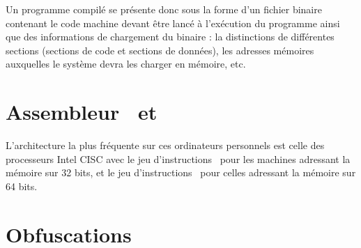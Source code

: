 Un programme compilé se présente donc sous la forme d'un fichier binaire contenant le code machine devant être lancé à l'exécution du programme ainsi que des informations de chargement du binaire : la distinctions de différentes sections (sections de code et sections de données), les adresses mémoires auxquelles le système devra les charger en mémoire, etc.

\section{Assembleur \xq\ et \xs}
L'architecture la plus fréquente sur ces ordinateurs personnels est celle des processeurs Intel CISC avec le jeu d'instructions \xq\ pour les machines adressant la mémoire sur 32 bits, et le jeu d'instructions \xs\ pour celles adressant la mémoire sur 64 bits.

\section{Obfuscations}
